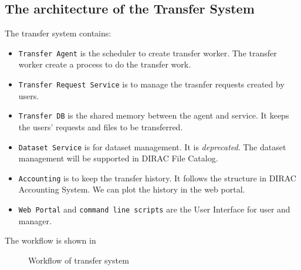\subsection{The architecture of the Transfer System}

The transfer system contains:

\begin{itemize}
    \item {\tt Transfer Agent} is the scheduler to create transfer worker.
          The transfer worker create a process to do the transfer work.
    \item {\tt Transfer Request Service} is to manage the trasnfer requests
          created by users.
    \item {\tt Transfer DB} is the shared memory between the agent and 
          service. It keeps the users' requests and files to be transferred.
    \item {\tt Dataset Service} is for dataset management. It is 
          {\em deprecated}. The dataset management will be supported in DIRAC 
          File Catalog.
    \item {\tt Accounting} is to keep the transfer history.
          It follows the structure in DIRAC Accounting System.
          We can plot the history in the web portal.
    \item {\tt Web Portal} and {\tt command line scripts} are the 
          User Interface for user and manager.
\end{itemize}

The workflow is shown in 
\begin{figure}
    
    \caption{Workflow of transfer system} \label{fig:workflow}
\end{figure}
